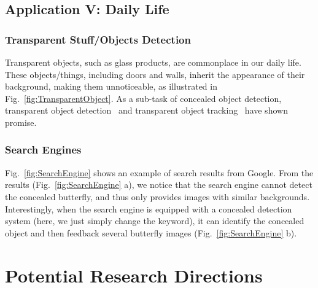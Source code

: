 \documentclass[10pt,journal,compsoc]{IEEEtran}
\def\ie{\emph{i.e.}}
\newcommand{\figref}[1]{Fig.~\ref{#1}}
\newcommand{\supp}[1]{#1}
\newcommand{\Rev}[1]{\textcolor{black}{#1}}
\begin{document}
\subsection{Application V: Daily Life}
\subsubsection{Transparent Stuff/Objects Detection}

Transparent objects, such as glass products, are commonplace in our daily life. 
These \Rev{objects}/things, including doors and walls, 
\Rev{inherit} the appearance of their background, making them unnoticeable, 
as illustrated in \figref{fig:TransparentObject}. 
As a sub-task of concealed object detection, 
transparent object detection~\cite{xie2020segmenting} and 
transparent object tracking~\cite{fan2020transparent} have shown promise.

\subsubsection{Search Engines}
\figref{fig:SearchEngine} shows an example of search results from Google.
From the results (\figref{fig:SearchEngine} a), 
we notice that the search engine cannot detect
the concealed butterfly, and thus only provides images with similar backgrounds.
%
Interestingly, when the search engine is equipped with a concealed 
detection system (here, we just simply change the keyword),
it can identify the concealed object and then feedback several butterfly images 
(\figref{fig:SearchEngine} b).



\section{Potential Research Directions}\label{sec:Future}
\end{document}
